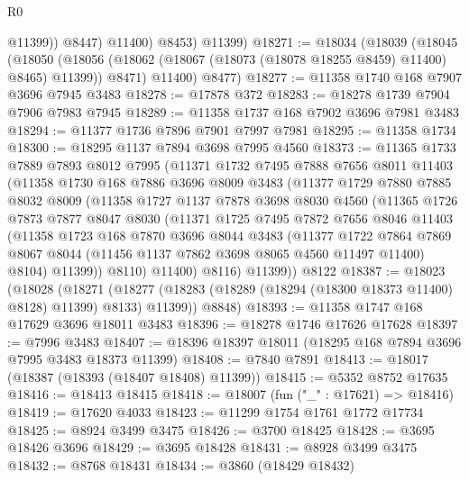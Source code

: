 \begin{lexlean}{R0}
\begin{coremodule}
                @11399))
            @8447)
          @11400)
        @8453)
      @11399)
@18271 := @18034
    (@18039
      (@18045
        (@18050 (@18056 (@18062 (@18067 (@18073 (@18078 @18255 @8459) @11400) @8465) @11399)) @8471)
        @11400)
      @8477)
@18277 := @11358 @1740 @168 @7907 @3696 @7945 @3483
@18278 := @17878 @372
@18283 := @18278 @1739 @7904 @7906 @7983 @7945
@18289 := @11358 @1737 @168 @7902 @3696 @7981 @3483
@18294 := @11377 @1736 @7896 @7901 @7997 @7981
@18295 := @11358 @1734
@18300 := @18295 @1137 @7894 @3698 @7995 @4560
@18373 := @11365
    @1733
    @7889
    @7893
    @8012
    @7995
    (@11371
      @1732
      @7495
      @7888
      @7656
      @8011
      @11403
      (@11358
        @1730
        @168
        @7886
        @3696
        @8009
        @3483
        (@11377
          @1729
          @7880
          @7885
          @8032
          @8009
          (@11358
            @1727
            @1137
            @7878
            @3698
            @8030
            @4560
            (@11365
              @1726
              @7873
              @7877
              @8047
              @8030
              (@11371
                @1725
                @7495
                @7872
                @7656
                @8046
                @11403
                (@11358
                  @1723
                  @168
                  @7870
                  @3696
                  @8044
                  @3483
                  (@11377
                    @1722
                    @7864
                    @7869
                    @8067
                    @8044
                    (@11456 @1137 @7862 @3698 @8065 @4560 @11497 @11400)
                    @8104)
                  @11399))
              @8110)
            @11400)
          @8116)
        @11399))
    @8122
@18387 := @18023
    (@18028
      (@18271 (@18277 (@18283 (@18289 (@18294 (@18300 @18373 @11400) @8128) @11399) @8133) @11399))
      @8848)
@18393 := @11358 @1747 @168 @17629 @3696 @18011 @3483
@18396 := @18278 @1746 @17626 @17628
@18397 := @7996 @3483
@18407 := @18396 @18397 @18011 (@18295 @168 @7894 @3696 @7995 @3483 @18373 @11399)
@18408 := @7840 @7891
@18413 := @18017 (@18387 (@18393 (@18407 @18408) @11399))
@18415 := @5352 @8752 @17635
@18416 := @18413 @18415
@18418 := @18007 (fun ("_" : @17621) => @18416)
@18419 := @17620 @4033
@18423 := @11299 @1754 @1761 @1772 @17734
@18425 := @8924 @3499 @3475
@18426 := @3700 @18425
@18428 := @3695 @18426 @3696
@18429 := @3695 @18428
@18431 := @8928 @3499 @3475
@18432 := @8768 @18431
@18434 := @3860 (@18429 @18432)

\end{coremodule}
\end{lexlean}
